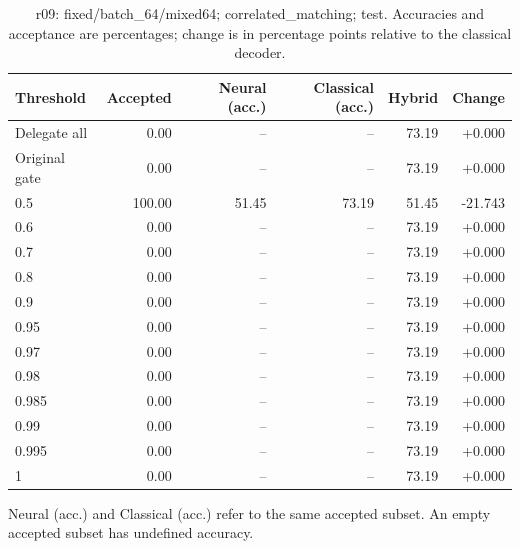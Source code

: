 \begin{table}[htbp]
\centering\small
\setlength{\tabcolsep}{3pt}
\caption{r09: fixed/batch\_64/mixed64; correlated\_matching; test. Accuracies and acceptance are percentages; change is in percentage points relative to the classical decoder.}
\begin{tabular}{lrrrrr}
\toprule
Threshold & Accepted & Neural (acc.) & Classical (acc.) & Hybrid & Change \\
\midrule
Delegate all & 0.00 & -- & -- & 73.19 & +0.000 \\
Original gate & 0.00 & -- & -- & 73.19 & +0.000 \\
0.5 & 100.00 & 51.45 & 73.19 & 51.45 & -21.743 \\
0.6 & 0.00 & -- & -- & 73.19 & +0.000 \\
0.7 & 0.00 & -- & -- & 73.19 & +0.000 \\
0.8 & 0.00 & -- & -- & 73.19 & +0.000 \\
0.9 & 0.00 & -- & -- & 73.19 & +0.000 \\
0.95 & 0.00 & -- & -- & 73.19 & +0.000 \\
0.97 & 0.00 & -- & -- & 73.19 & +0.000 \\
0.98 & 0.00 & -- & -- & 73.19 & +0.000 \\
0.985 & 0.00 & -- & -- & 73.19 & +0.000 \\
0.99 & 0.00 & -- & -- & 73.19 & +0.000 \\
0.995 & 0.00 & -- & -- & 73.19 & +0.000 \\
1 & 0.00 & -- & -- & 73.19 & +0.000 \\
\bottomrule
\end{tabular}
\par\smallskip\footnotesize Neural (acc.) and Classical (acc.) refer to the same accepted subset. An empty accepted subset has undefined accuracy.
\end{table}
